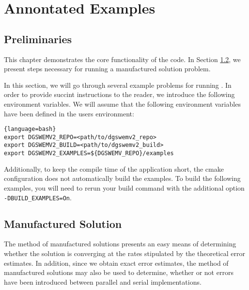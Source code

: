 \chapter{Annontated Examples}
\section{Preliminaries}

This chapter demonstrates the core functionality of the code. In Section \ref{sec:mansol}, we present steps necessary for running a manufactured solution problem.

In this section, we will go through several example problems for running . In order to provide succint instructions to the reader, we introduce the following environment variables. We will assume that the following environment variables have been defined in the users environment:
\begin{lstlisting}{language=bash}
export DGSWEMV2_REPO=<path/to/dgswemv2_repo>
export DGSWEMV2_BUILD=<path/to/dgswemv2_build>
export DGSWEMV2_EXAMPLES=${DGSWEMV_REPO}/examples
\end{lstlisting}

Additionally, to keep the compile time of the application short, the cmake configuration does not automatically build the examples. To build the following examples, you will need to rerun your  build command with the additional option \lstinline{-DBUILD_EXAMPLES=On}.



\section{Manufactured Solution}
\label{sec:mansol}
The method of manufactured solutions presents an easy means of determining whether the solution is converging at the rates stipulated by the theoretical error estimates. In addition, since we obtain exact error estimates, the method of manufactured solutions may also be used to determine, whether or not errors have been introduced between parallel and serial implementations.

